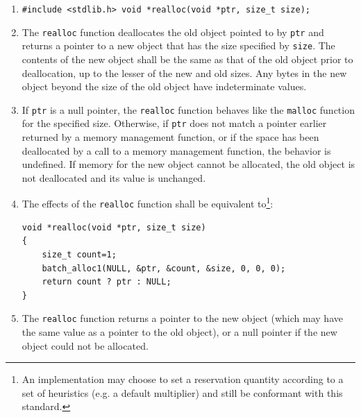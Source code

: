 \documentclass[wd]{isov2}
\begin{document}
{
\begin{enumerate}
\renewcommand{\theenumi}{\arabic{enumi}}
\item \texttt{\#include <stdlib.h>\linebreak
void *realloc(void *ptr, size\_t size);}
\item The \texttt{realloc} function deallocates the old object pointed to by \texttt{ptr} and returns a pointer to a new object that has the size specified by \texttt{size}. The contents of the new object shall be the same as that of the old object prior to deallocation, up to the lesser of the new and old sizes. Any bytes in the new object beyond the size of the old object have indeterminate values.
\item If \texttt{ptr} is a null pointer, the \texttt{realloc} function behaves like the \texttt{malloc} function for the specified size. Otherwise, if \texttt{ptr} does not match a pointer earlier returned by a memory management function, or if the space has been deallocated by a call to \textcolor{changed}{a memory management function}, the behavior is undefined. If memory for the new object cannot be allocated, the old object is not deallocated and its value is unchanged.
\color{changed}
\item The effects of the \texttt{realloc} function shall be equivalent to\footnote{An implementation may choose to set a reservation quantity according to a set of heuristics (e.g. a default multiplier) and still be conformant with this standard.}:
\begin{verbatim}
void *realloc(void *ptr, size_t size)
{
    size_t count=1;
    batch_alloc1(NULL, &ptr, &count, &size, 0, 0, 0);
    return count ? ptr : NULL;
}
\end{verbatim}
\color{black}
\item The \texttt{realloc} function returns a pointer to the new object (which may have the same value as a pointer to the old object), or a null pointer if the new object could not be allocated.
\end{enumerate}

}
\end{document}
